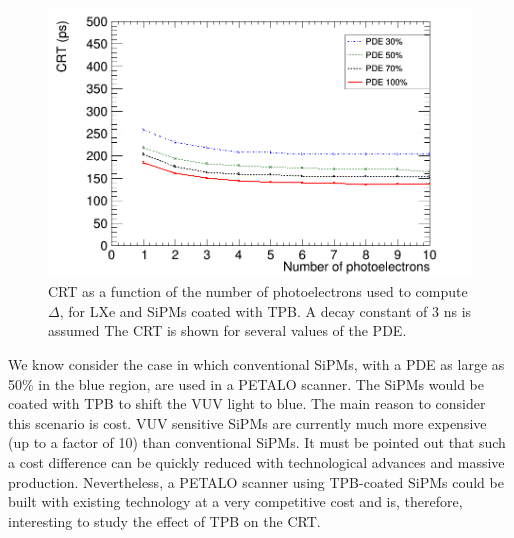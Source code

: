 \documentclass[review]{elsarticle}
\begin{document}
\begin{figure}[!bhtp]
	\centering
	\includegraphics[scale=0.4]{../img/PetaloTOF/tpb_noCher_3d0ns_avg_npe_phys}
	\caption{\label{fig.crtTPB3ns} CRT as a function of the number of photoelectrons used to compute $\Delta$, for LXe and SiPMs coated with TPB. A decay constant of 3 ns is assumed The CRT is shown for several values of the PDE. }
\end{figure}


We know consider the case in which conventional SiPMs, with a PDE as large as 50\% in the blue region, are used in a PETALO scanner. The SiPMs would be coated with TPB to shift the VUV light to blue. The main reason to consider this scenario is cost. VUV sensitive SiPMs are currently much more expensive (up to a factor of 10) than conventional SiPMs. It must be pointed out that such a cost difference can be quickly reduced with technological advances and massive production. Nevertheless, a PETALO scanner using TPB-coated SiPMs could be built with existing technology at a very competitive cost and is, therefore, interesting to study the effect of TPB on the CRT.
\end{document}
